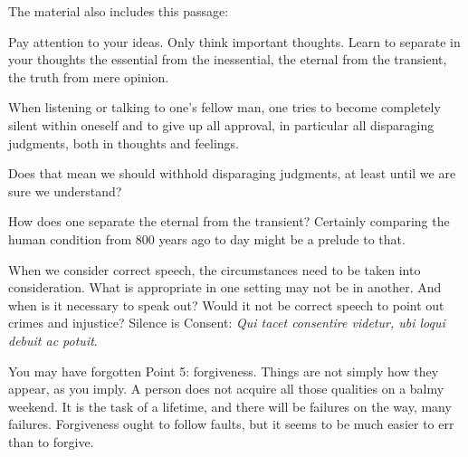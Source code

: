 \begin{footnotesize}
\begin{sffamily}
The material also includes this passage:

\begin{quotex}\footnotesize
Pay attention to your ideas. Only think important thoughts. Learn to separate in your thoughts the essential from the inessential, the eternal from the transient, the truth from mere opinion.

When listening or talking to one's fellow man, one tries to become completely silent within oneself and to give up all approval, in particular all disparaging judgments, both in thoughts and feelings. 

\end{quotex}
Does that mean we should withhold disparaging judgments, at least until we are sure we understand?

How does one separate the eternal from the transient? Certainly comparing the human condition from 800 years ago to day might be a prelude to that.


When we consider correct speech, the circumstances need to be taken into consideration. What is appropriate in one setting may not be in another. And when is it necessary to speak out? Would it not be correct speech to point out crimes and injustice? Silence is Consent: \textit{Qui tacet consentire videtur, ubi loqui debuit ac potuit}.

You may have forgotten Point 5: forgiveness. Things are not simply how they appear, as you imply. A person does not acquire all those qualities on a balmy weekend. It is the task of a lifetime, and there will be failures on the way, many failures. Forgiveness ought to follow faults, but it seems to be much easier to err than to forgive.


\end{sffamily}\end{footnotesize}
